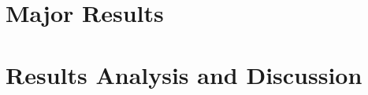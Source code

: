 

\section{Major Results}
    \label{sec:major_res}
    

\section{Results Analysis and Discussion}
    \label{sec:res_analysis_discuss}
    